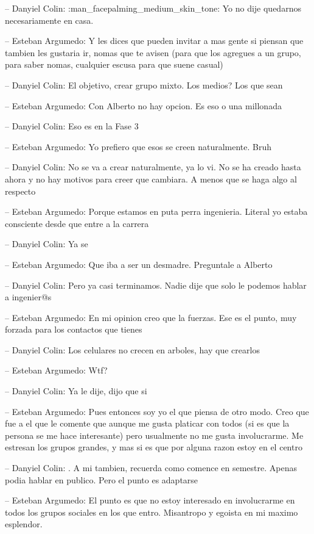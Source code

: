 -- Danyiel Colin: :man\_facepalming\_medium\_skin\_tone: Yo no dije
quedarnos necesariamente en casa.

-- Esteban Argumedo: Y les dices que pueden invitar a mas gente si
piensan que tambien les gustaria ir, nomas que te avisen (para que los
agregues a un grupo, para saber nomas, cualquier escusa para que suene
casual)

-- Danyiel Colin: El objetivo, crear grupo mixto. Los medios? Los que
sean

-- Esteban Argumedo: Con Alberto no hay opcion. Es eso o una millonada

-- Danyiel Colin: Eso es en la Fase 3

-- Esteban Argumedo: Yo prefiero que esos se creen naturalmente. Bruh

-- Danyiel Colin: No se va a crear naturalmente, ya lo vi. No se ha
creado hasta ahora y no hay motivos para creer que cambiara. A menos que
se haga algo al respecto

-- Esteban Argumedo: Porque estamos en puta perra ingenieria. Literal yo
estaba consciente desde que entre a la carrera

-- Danyiel Colin: Ya se

-- Esteban Argumedo: Que iba a ser un desmadre. Preguntale a Alberto

-- Danyiel Colin: Pero ya casi terminamos. Nadie dije que solo le
podemos hablar a ingenier@s

-- Esteban Argumedo: En mi opinion creo que la fuerzas. Ese es el punto,
muy forzada para los contactos que tienes

-- Danyiel Colin: Los celulares no crecen en arboles, hay que crearlos

-- Esteban Argumedo: Wtf?

-- Danyiel Colin: Ya le dije, dijo que si

-- Esteban Argumedo: Pues entonces soy yo el que piensa de otro modo.
Creo que fue a el que le comente que aunque me gusta platicar con todos
(si es que la persona se me hace interesante) pero usualmente no me
gusta involucrarme. Me estresan los grupos grandes, y mas si es que por
alguna razon estoy en el centro

-- Danyiel Colin: . A mi tambien, recuerda como comence en semestre.
Apenas podia hablar en publico. Pero el punto es adaptarse

-- Esteban Argumedo: El punto es que no estoy interesado en involucrarme
en todos los grupos sociales en los que entro. Misantropo y egoista en
mi maximo esplendor.

